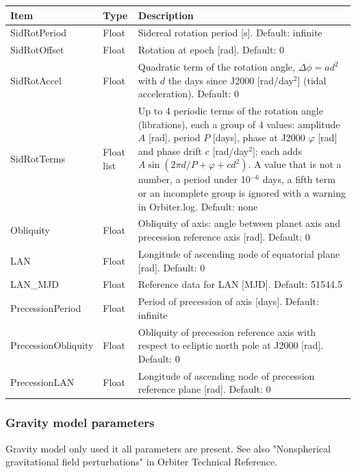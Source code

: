 \documentclass[Orbiter Developer Manual.tex]{subfiles}
\begin{document}
	\begin{longtable}{ |p{}|p{}|p{}| }
	\hline\rule{0pt}{2ex}
	\textbf{Item} & \textbf{Type} & \textbf{Description}\\
	\hline\rule{0pt}{2ex}
	SidRotPeriod & Float & Sidereal rotation period [s]. Default: infinite\\
	\hline\rule{0pt}{2ex}
	SidRotOffset & Float & Rotation at epoch [rad]. Default: 0\\
	\hline\rule{0pt}{2ex}
	SidRotAccel & Float & Quadratic term of the rotation angle, $\Delta\phi = a d^2$ with $d$ the days since J2000 [rad/day$^2$] (tidal acceleration). Default: 0\\
	\hline\rule{0pt}{2ex}
	SidRotTerms & Float list & Up to 4 periodic terms of the rotation angle (librations), each a group of 4 values: amplitude $A$ [rad], period $P$ [days], phase at J2000 $\varphi$ [rad] and phase drift $c$ [rad/day$^2$]; each adds $A \sin(2\pi d/P + \varphi + c d^2)$. A value that is not a number, a period under 10$^{-6}$ days, a fifth term or an incomplete group is ignored with a warning in Orbiter.log. Default: none\\
	\hline\rule{0pt}{2ex}
	Obliquity & Float & Obliquity of axis: angle between planet axis and precession reference axis [rad]. Default: 0\\
	\hline\rule{0pt}{2ex}
	LAN & Float & Longitude of ascending node of equatorial plane [rad]. Default: 0\\
	\hline\rule{0pt}{2ex}
	LAN\_MJD & Float & Reference data for LAN [MJD]. Default: 51544.5\\
	\hline\rule{0pt}{2ex}
	PrecessionPeriod & Float & Period of precession of axis [days]. Default: infinite\\
	\hline\rule{0pt}{2ex}
	PrecessionObliquity & Float & Obliquity of precession reference axis with respect to ecliptic north pole at J2000 [rad]. Default: 0\\
	\hline\rule{0pt}{2ex}
	PrecessionLAN & Float & Longitude of ascending node of precession reference plane [rad]. Default: 0\\
	\hline
	\end{longtable}


\subsubsection*{Gravity model parameters}
Gravity model only used it all parameters are present. See also "Nonspherical gravitational field perturbations" in Orbiter Technical Reference.
\end{document}
